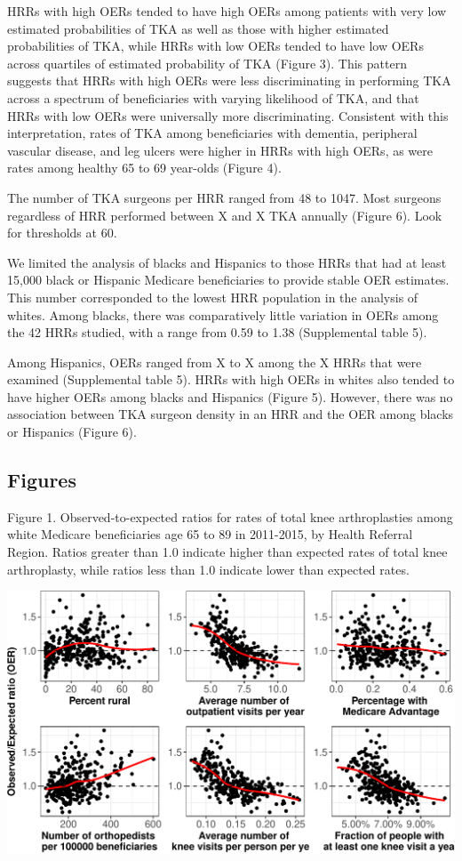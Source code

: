 \documentclass[]{article}
\begin{document}
HRRs with high OERs tended to have high OERs among patients with very
low estimated probabilities of TKA as well as those with higher
estimated probabilities of TKA, while HRRs with low OERs tended to have
low OERs across quartiles of estimated probability of TKA (Figure 3).
This pattern suggests that HRRs with high OERs were less discriminating
in performing TKA across a spectrum of beneficiaries with varying
likelihood of TKA, and that HRRs with low OERs were universally more
discriminating. Consistent with this interpretation, rates of TKA among
beneficiaries with dementia, peripheral vascular disease, and leg ulcers
were higher in HRRs with high OERs, as were rates among healthy 65 to 69
year-olds (Figure 4).

The number of TKA surgeons per HRR ranged from 48 to 1047. Most surgeons
regardless of HRR performed between X and X TKA annually (Figure 6).
Look for thresholds at 60.

We limited the analysis of blacks and Hispanics to those HRRs that had
at least 15,000 black or Hispanic Medicare beneficiaries to provide
stable OER estimates. This number corresponded to the lowest HRR
population in the analysis of whites. Among blacks, there was
comparatively little variation in OERs among the 42 HRRs studied, with a
range from 0.59 to 1.38 (Supplemental table 5).

Among Hispanics, OERs ranged from X to X among the X HRRs that were
examined (Supplemental table 5). HRRs with high OERs in whites also
tended to have higher OERs among blacks and Hispanics (Figure 5).
However, there was no association between TKA surgeon density in an HRR
and the OER among blacks or Hispanics (Figure 6).

\hypertarget{figures}{%
\subsection{Figures}\label{figures}}

Figure 1. Observed-to-expected ratios for rates of total knee
arthroplasties among white Medicare beneficiaries age 65 to 89 in
2011-2015, by Health Referral Region. Ratios greater than 1.0 indicate
higher than expected rates of total knee arthroplasty, while ratios less
than 1.0 indicate lower than expected rates.

\includegraphics{Results_files/figure-latex/Results-5-1.pdf}
\end{document}
